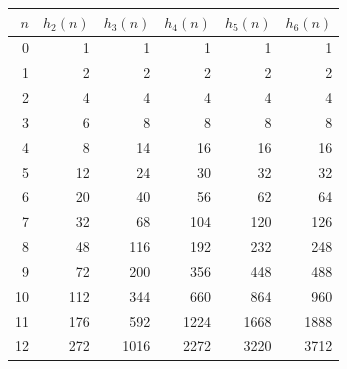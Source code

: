 \begin{center}
\begin{tabular}{@{}rrrrrr@{}}
\toprule
$n$ & $h_2(n)$ & $h_3(n)$ & $h_4(n)$ & $h_5(n)$ & $h_6(n)$\\
\midrule
0 & 1 & 1 & 1 & 1 & 1\\
1 & 2 & 2 & 2 & 2 & 2\\
2 & 4 & 4 & 4 & 4 & 4\\
3 & 6 & 8 & 8 & 8 & 8\\
4 & 8 & 14 & 16 & 16 & 16\\
5 & 12 & 24 & 30 & 32 & 32\\
6 & 20 & 40 & 56 & 62 & 64\\
7 & 32 & 68 & 104 & 120 & 126\\
8 & 48 & 116 & 192 & 232 & 248\\
9 & 72 & 200 & 356 & 448 & 488\\
10 & 112 & 344 & 660 & 864 & 960\\
11 & 176 & 592 & 1224 & 1668 & 1888\\
12 & 272 & 1016 & 2272 & 3220 & 3712\\
\bottomrule
\end{tabular}
\end{center}
